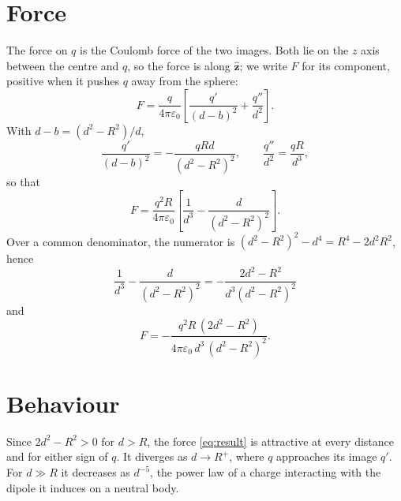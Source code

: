 \documentclass{article}
\begin{document}
\section{Force}
The force on $q$ is the Coulomb force of the two images. Both lie on the $z$ axis between the centre and $q$, so the force is along $\hat{\mathbf z}$; we write $F$ for its component, positive when it pushes $q$ away from the sphere:
\begin{equation}
  F = \frac{q}{4\pi\varepsilon_0}\left[\frac{q'}{(d-b)^2} + \frac{q''}{d^2}\right] .
  \label{eq:force}
\end{equation}
With $d - b = (d^2 - R^2)/d$,
\begin{equation}
  \frac{q'}{(d-b)^2} = -\frac{qRd}{(d^2-R^2)^2}, \qquad \frac{q''}{d^2} = \frac{qR}{d^3},
  \label{eq:terms}
\end{equation}
so that
\begin{equation}
  F = \frac{q^2 R}{4\pi\varepsilon_0}\left[\frac{1}{d^3} - \frac{d}{(d^2-R^2)^2}\right] .
  \label{eq:force2}
\end{equation}
Over a common denominator, the numerator is $(d^2 - R^2)^2 - d^4 = R^4 - 2d^2R^2$, hence
\begin{equation}
  \frac{1}{d^3} - \frac{d}{(d^2-R^2)^2} = -\frac{2d^2 - R^2}{d^3(d^2-R^2)^2}
  \label{eq:combine}
\end{equation}
and
\begin{equation}
  F = -\frac{q^2 R\,(2d^2 - R^2)}{4\pi\varepsilon_0\, d^3\,(d^2 - R^2)^2} .
  \label{eq:result}
\end{equation}

\section{Behaviour}
Since $2d^2 - R^2 > 0$ for $d > R$, the force \eqref{eq:result} is attractive at every distance and for either sign of $q$. It diverges as $d \to R^+$, where $q$ approaches its image $q'$. For $d \gg R$ it decreases as $d^{-5}$, the power law of a charge interacting with the dipole it induces on a neutral body.
\end{document}
